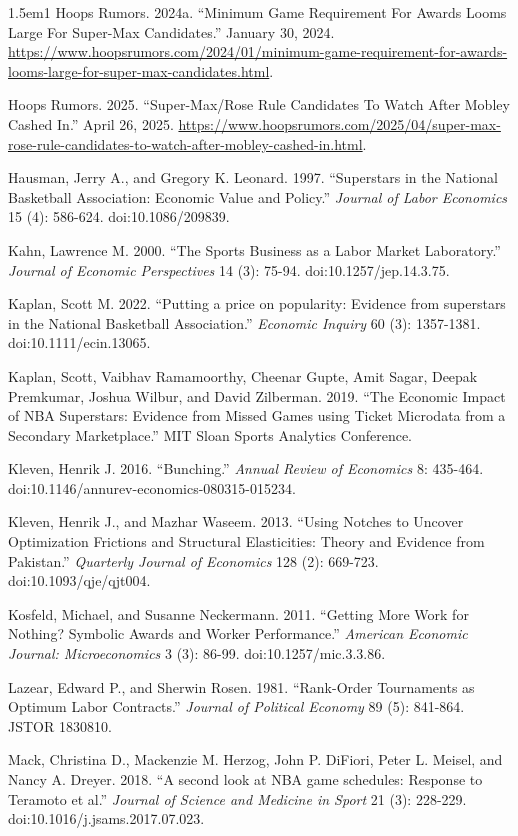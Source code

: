 \documentclass[11pt]{article}
\begin{document}
\begin{hangparas}{1.5em}{1}
Hoops Rumors. 2024a. ``Minimum Game Requirement For Awards Looms Large For Super-Max Candidates.'' January 30, 2024. \url{https://www.hoopsrumors.com/2024/01/minimum-game-requirement-for-awards-looms-large-for-super-max-candidates.html}.

Hoops Rumors. 2025. ``Super-Max/Rose Rule Candidates To Watch After Mobley Cashed In.'' April 26, 2025. \url{https://www.hoopsrumors.com/2025/04/super-max-rose-rule-candidates-to-watch-after-mobley-cashed-in.html}.

Hausman, Jerry A., and Gregory K. Leonard. 1997. ``Superstars in the National Basketball Association: Economic Value and Policy.'' \emph{Journal of Labor Economics} 15 (4): 586-624. doi:10.1086/209839.

Kahn, Lawrence M. 2000. ``The Sports Business as a Labor Market Laboratory.'' \emph{Journal of Economic Perspectives} 14 (3): 75-94. doi:10.1257/jep.14.3.75.

Kaplan, Scott M. 2022. ``Putting a price on popularity: Evidence from superstars in the National Basketball Association.'' \emph{Economic Inquiry} 60 (3): 1357-1381. doi:10.1111/ecin.13065.

Kaplan, Scott, Vaibhav Ramamoorthy, Cheenar Gupte, Amit Sagar, Deepak Premkumar, Joshua Wilbur, and David Zilberman. 2019. ``The Economic Impact of NBA Superstars: Evidence from Missed Games using Ticket Microdata from a Secondary Marketplace.'' MIT Sloan Sports Analytics Conference.

Kleven, Henrik J. 2016. ``Bunching.'' \emph{Annual Review of Economics} 8: 435-464. doi:10.1146/annurev-economics-080315-015234.

Kleven, Henrik J., and Mazhar Waseem. 2013. ``Using Notches to Uncover Optimization Frictions and Structural Elasticities: Theory and Evidence from Pakistan.'' \emph{Quarterly Journal of Economics} 128 (2): 669-723. doi:10.1093/qje/qjt004.

Kosfeld, Michael, and Susanne Neckermann. 2011. ``Getting More Work for Nothing? Symbolic Awards and Worker Performance.'' \emph{American Economic Journal: Microeconomics} 3 (3): 86-99. doi:10.1257/mic.3.3.86.

Lazear, Edward P., and Sherwin Rosen. 1981. ``Rank-Order Tournaments as Optimum Labor Contracts.'' \emph{Journal of Political Economy} 89 (5): 841-864. JSTOR 1830810.

Mack, Christina D., Mackenzie M. Herzog, John P. DiFiori, Peter L. Meisel, and Nancy A. Dreyer. 2018. ``A second look at NBA game schedules: Response to Teramoto et al.'' \emph{Journal of Science and Medicine in Sport} 21 (3): 228-229. doi:10.1016/j.jsams.2017.07.023.


\end{hangparas}
\end{document}
